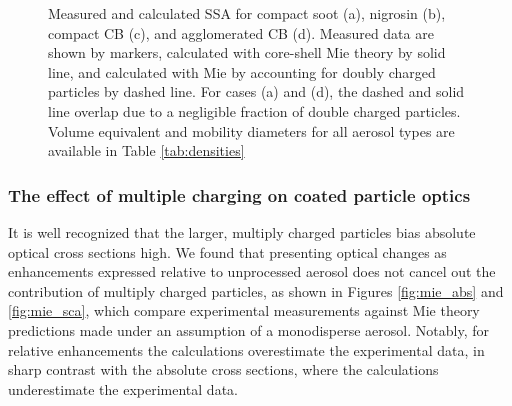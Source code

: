 \documentclass[12pt,authoryear]{elsarticle}
\providecommand{\DIFaddendFL}{} %
\begin{document}
\begin{figure}[htp]
{}
    \DIFaddendFL \caption{Measured and calculated SSA for compact soot (a), nigrosin (b), compact CB (c), and agglomerated CB (d). Measured data are shown by markers, calculated with core-shell Mie theory  by solid line, and calculated with Mie by accounting for doubly charged particles by dashed line. For cases (a) and (d), the dashed and solid line overlap due to a negligible fraction of double charged particles. Volume equivalent and mobility diameters for all aerosol types are available in Table \ref{tab:densities}}
    \label{fig:ssa}
\end{figure}


\subsubsection{The effect of multiple charging on coated particle optics}

It is well recognized that the larger, multiply charged particles bias absolute optical cross sections high. We found that presenting optical changes as enhancements expressed relative to unprocessed aerosol does not cancel out the contribution of multiply charged particles, as shown in Figures \ref{fig:mie_abs} and \ref{fig:mie_sca}, which compare experimental measurements against Mie theory predictions made under an assumption of a monodisperse aerosol. Notably, for relative enhancements the calculations overestimate the experimental data, in sharp contrast with the absolute cross sections, where the calculations underestimate the experimental data.
\end{document}
